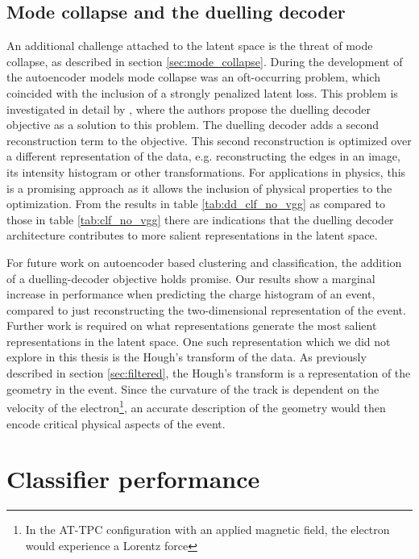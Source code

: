 \subsection{Mode collapse and the duelling decoder}

An additional challenge attached to the latent space is the threat of mode collapse, as described in section \ref{sec:mode_collapse}. During the development of the autoencoder models mode collapse was an oft-occurring problem, which coincided with the inclusion of a strongly penalized latent loss. This problem is investigated in detail by \citet{Seybold2019}, where the authors propose the duelling decoder objective as a solution to this problem. The duelling decoder adds a second reconstruction term to the objective. This second reconstruction is optimized over a different representation of the data, e.g. reconstructing the edges in an image, its intensity histogram or other transformations. For applications in physics, this is a promising approach as it allows the inclusion of physical properties to the optimization. From the results in table \ref{tab:dd_clf_no_vgg} as compared to those in table \ref{tab:clf_no_vgg} there are indications that the duelling decoder architecture contributes to more salient representations in the latent space. 

For future work on autoencoder based clustering and classification, the addition of a duelling-decoder objective holds promise. Our results show a marginal increase in performance when predicting the charge histogram of an event, compared to just reconstructing the two-dimensional representation of the event. Further work is required on what representations generate the most salient representations in the latent space. One such representation which we did not explore in this thesis is the Hough's transform of the data. As previously described in section \ref{sec:filtered}, the Hough's transform is a representation of the geometry in the event. Since the curvature of the track is dependent on the velocity of the electron\footnote{In the AT-TPC configuration with an applied magnetic field, the electron would experience a Lorentz force}, an accurate description of the geometry would then encode critical physical aspects of the event.


\section{Classifier performance}

